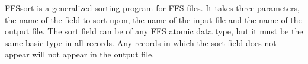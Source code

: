 FFSsort is a generalized sorting program for FFS files.  It takes three
parameters, the name of the field to sort upon, the name of the input file and
the name of the output file.  The sort field can be of any FFS atomic data
type, but it must be the same basic type in all records.  Any records in which
the sort field does not appear will not appear in the output file.


%

\printindex


